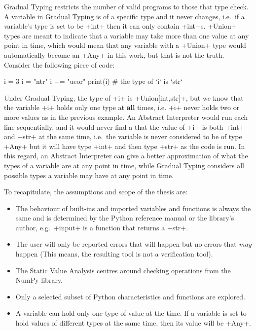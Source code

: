 Gradual Typing restricts the number of valid programs to those that type
check. A variable in Gradual Typing is of a specific type and it never
changes, i.e.~if a variable's type is set to be \pycode+int+ then it can
only contain \pycode+int+s. \pycode+Union+ types are meant to indicate
that a variable may take more than one value at any point in time, which
would mean that any variable with a \pycode+Union+ type would
automatically become an \pycode+Any+ in this work, but that is not the
truth. Consider the following piece of code:

\begin{pythoncode}
i = 3
i = "ntr"
i += "ueor"
print(i)  # the type of `i` is `str`
\end{pythoncode}

Under Gradual Typing, the type of \pycode+i+ is
\pycode+Union[int,str]+, but we know that the variable \pycode+i+
holds only one type at \textbf{all} times, i.e. \pycode+i+ never holds
two or more values as in the previous example. An Abstract Interpreter
would run each line sequentially, and it would never find a that the
value of \pycode+i+ is both \pycode+int+ and \pycode+str+ at the same
time, i.e.~the variable is never considered to be of type \pycode+Any+
but it will have type \pycode+int+ and then type \pycode+str+ as the
code is run. In this regard, an Abstract Interpreter can give a better
approximation of what the types of a variable are at any point in time,
while Gradual Typing considers all possible types a variable may have at
any point in time.

To recapitulate, the assumptions and scope of the thesis are:

\begin{itemize}
\tightlist
\item
  The behaviour of built-ins and imported variables and functions is
  always the same and is determined by the Python reference manual or
  the library's author, e.g.~\pycode+input+ is a function that returns
  a \pycode+str+.
\item
  The user will only be reported errors that will happen but no errors
  that \emph{may} happen (This means, the resulting tool is not a
  verification tool).
\item
  The Static Value Analysis centres around checking operations from the
  NumPy library.
\item
  Only a selected subset of Python characteristics and functions are
  explored.
\item
  A variable can hold only one type of value at the time. If a variable
  is set to hold values of different types at the same time, then its
  value will be \pycode+Any+.
\end{itemize}

